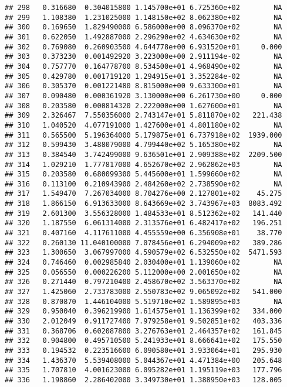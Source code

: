 \documentclass[
]{article}
\begin{document}
\begin{verbatim}
## 298   0.316680  0.304015800 1.145700e+01 6.725360e+02        NA
## 299   1.108380  1.231025000 1.148150e+02 8.062380e+02        NA
## 300   0.169650  1.829490000 6.586000e+00 8.096370e+02        NA
## 301   0.622050  1.492887000 2.296290e+02 4.634630e+02        NA
## 302   0.769080  0.260903500 4.644778e+00 6.931520e+01     0.000
## 303   0.373230  0.001492920 3.223000e+00 2.911194e-02        NA
## 304   0.757770  0.164778700 8.534500e+01 4.968490e+02        NA
## 305   0.429780  0.001719120 1.294915e+01 3.352284e-02        NA
## 306   0.305370  0.001221480 8.815000e+00 9.633300e+01        NA
## 307   0.090480  0.000361920 3.130000e+00 6.261730e+00     0.000
## 308   0.203580  0.000814320 2.222000e+00 1.627600e+01        NA
## 309   2.326467  7.550356000 2.743147e+01 5.811870e+02   221.438
## 310   1.040520  4.077191000 1.427600e+01 4.801180e+02        NA
## 311   0.565500  5.196364000 5.179875e+01 6.737918e+02  1939.000
## 312   0.599430  3.488079000 4.799440e+02 5.165380e+02        NA
## 313   0.384540  3.742499000 9.636501e+01 2.909388e+02  2209.500
## 314   1.029210  1.777817000 4.652670e+02 2.962862e+03        NA
## 315   0.203580  0.680099300 5.445600e+01 1.599660e+02        NA
## 316   0.113100  0.210943900 2.484260e+02 2.738590e+02        NA
## 317   1.549470  7.267034000 8.704276e+00 2.127801e+02    45.275
## 318   1.866150  6.913633000 8.643669e+02 3.743967e+03  8083.492
## 319   2.601300  3.556328000 1.484533e+01 8.512362e+02   141.440
## 320   1.187550  6.061314000 2.313576e+01 6.482417e+02   196.251
## 321   0.407160  4.117611000 4.455559e+00 6.356908e+01    38.770
## 322   0.260130 11.040100000 7.078456e+01 6.294009e+02   389.286
## 323   1.300650  3.067997000 4.590579e+02 6.532550e+02  5471.593
## 324   0.746460  0.002985840 2.030400e+01 1.139060e+02        NA
## 325   0.056550  0.000226200 5.112000e+00 2.001650e+02        NA
## 326   0.271440  0.797210400 2.458670e+02 3.563370e+02        NA
## 327   1.425060  2.733783000 2.550783e+02 9.065092e+02   541.000
## 328   0.870870  1.446104000 5.519710e+02 1.589895e+03        NA
## 329   0.950040  0.396219900 1.614575e+01 1.136399e+02   334.000
## 330   2.012049  0.911727400 7.979258e+01 9.502851e+02   403.336
## 331   0.368706  0.602087800 3.276763e+01 2.464357e+02   161.845
## 332   0.904800  0.495710500 5.241933e+01 8.666641e+02   175.550
## 333   0.194532  0.223516600 6.090580e+01 3.933064e+01   295.930
## 334   1.436370  5.539408000 5.044367e+01 4.471384e+00   205.648
## 335   1.707810  4.001623000 6.095282e+01 1.195119e+03   177.796
## 336   1.198860  2.286402000 3.349730e+01 1.388950e+03   128.005

\end{verbatim}
\end{document}
